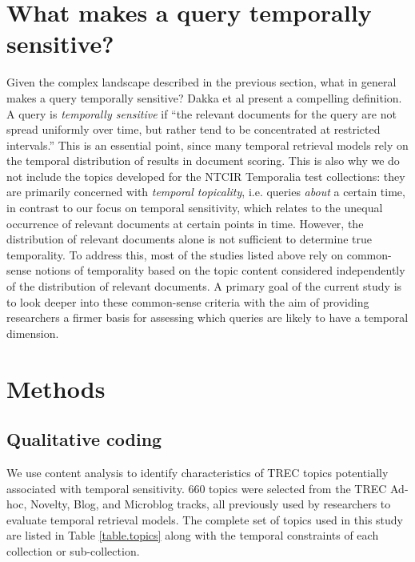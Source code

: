 \documentclass{sig-alternate-05-2015}
\begin{document}
\section{What makes a query temporally sensitive?}

Given the complex landscape described in the previous section, what in general makes a query temporally sensitive? Dakka et al \cite{Dakka2012} present a compelling definition. A query is \emph{temporally sensitive}  if  ``the relevant documents for the query are not spread uniformly over time, but rather tend to be concentrated at restricted intervals.'' This is an essential point, since many temporal retrieval models rely on the temporal distribution of results in document scoring. This is also why we do not include the topics developed for the NTCIR Temporalia test collections: they are primarily concerned with \emph{temporal topicality}, i.e. queries \emph{about} a certain time, in contrast to our focus on temporal sensitivity, which relates to the unequal occurrence of relevant documents at certain points in time. However, the distribution of relevant documents alone is not sufficient to determine true temporality. To address this, most of the studies listed above rely on common-sense notions of temporality based on the topic content considered independently of the distribution of relevant documents. A primary goal of the current study is to look deeper into these common-sense criteria with the aim of providing researchers a firmer basis for assessing which queries are likely to have a temporal  dimension.


\section{Methods}
\vspace{-1em}
\subsection{Qualitative coding}
We use content analysis \cite{Krippendorff1980} to identify characteristics of TREC topics potentially associated with temporal sensitivity. 660 topics were selected from the TREC Ad-hoc, Novelty, Blog, and Microblog tracks, all previously used by researchers to evaluate temporal retrieval models. The complete set of topics used in this study are listed in Table \ref{table.topics} along with the temporal constraints of each collection or sub-collection.
\end{document}
